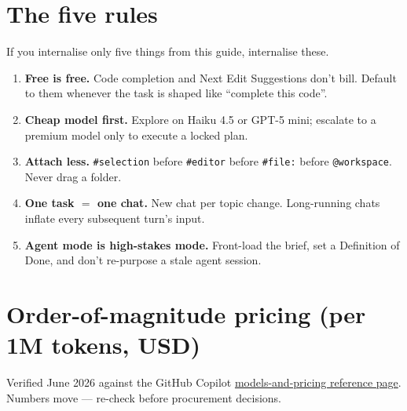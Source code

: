 \documentclass[11pt,a4paper]{article}
\begin{document}
\section{The five rules}\label{sec:rules}

If you internalise only five things from this guide, internalise these.

\begin{enumerate}[label=\textbf{\arabic*.}]
  \item \textbf{Free is free.} Code completion and Next Edit Suggestions don't bill. Default to them whenever the task is shaped like ``complete this code''.
  \item \textbf{Cheap model first.} Explore on Haiku 4.5 or GPT-5 mini; escalate to a premium model only to execute a locked plan.
  \item \textbf{Attach less.} \texttt{\#selection} before \texttt{\#editor} before \texttt{\#file:} before \texttt{@workspace}. Never drag a folder.
  \item \textbf{One task $=$ one chat.} New chat per topic change. Long-running chats inflate every subsequent turn's input.
  \item \textbf{Agent mode is high-stakes mode.} Front-load the brief, set a Definition of Done, and don't re-purpose a stale agent session.
\end{enumerate}

\appendix
\section{Order-of-magnitude pricing (per 1M tokens, USD)}\label{app:pricing}

Verified June 2026 against the GitHub Copilot \href{https://docs.github.com/en/copilot/reference/copilot-billing/models-and-pricing}{models-and-pricing reference page}. Numbers move --- re-check before procurement decisions.
\end{document}
